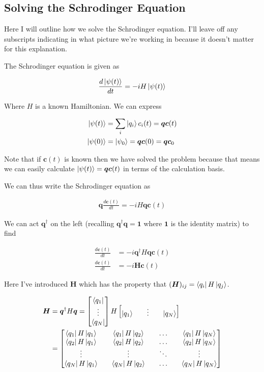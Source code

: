 \documentclass[12pt]{article}
\newcommand{\ddt}[1]{\frac{d #1}{dt}}
\newcommand{\bv}[1]{\boldsymbol{#1}}
\begin{document}
\subsection{Solving the Schrodinger Equation}

Here I will outline how we solve the Schrodinger equation. I'll leave off any subscripts indicating in what picture we're working in because it doesn't matter for this explanation.

The Schrodinger equation is given as

\begin{align}
\ddt{\ket{\psi(t)}} = -iH\ket{\psi(t)}
\end{align}

Where $H$ is a known Hamiltonian. We can express

\begin{align}
\ket{\psi(t)} &= \sum_i \ket{q_i} c_i(t) = \bv{q}\bv{c}(t)\\
\ket{\psi(0)} &= \ket{\psi_0} = \bv{q}\bv{c}(0) = \bv{q}\bv{c}_0
\end{align}

Note that if $\bv{c}(t)$ is known then we have solved the problem because that means we can easily calculate $\ket{\psi(t)} = \bv{q}\bv{c}(t)$ in terms of the calculation basis.

We can thus write the Schrodinger equation as

\begin{align}
\bv{q}\ddt{\bv{c}(t)} = -i H \bv{q} \bv{c}(t)
\end{align}

We can act $\bv{q}^{\dag}$ on the left (recalling $\bv{q}^{\dag}\bv{q} = \bv{1}$ where $\bv{1}$ is the identity matrix) to find

\begin{align}
\ddt{\bv{c}(t)} &= -i\bv{q}^{\dag} H \bv{q} \bv{c}(t)\\
\ddt{\bv{c}(t)} &= -i \bv{H}\bv{c}(t)
\end{align}

Here I've introduced $\bv{H}$ which has the property that $(\bv{H})_{ij} = \bra{q_i}H\ket{q_j}$.

\begin{align}
\bv{H} &= \bv{q}^{\dag}H\bv{q} =
\begin{bmatrix}
\bra{q_1}\\\vdots\\\bra{q_N}
\end{bmatrix}
H
\begin{bmatrix}
\ket{q_1}&&\vdots&&\ket{q_N}
\end{bmatrix}\\
&= \begin{bmatrix}
\bra{q_1}H\ket{q_1}&&\bra{q_1}H\ket{q_2}&&\ldots&& \bra{q_1}H\ket{q_N}\\
\bra{q_2}H\ket{q_1}&&\bra{q_2}H\ket{q_2}&&\ldots&& \bra{q_2}H\ket{q_N}\\
\vdots && \vdots && \ddots && \vdots\\
\bra{q_N}H\ket{q_1} && \bra{q_N}H\ket{q_2} && \ldots && \bra{q_N}H\ket{q_N}
\end{bmatrix}
\end{align}
\end{document}
